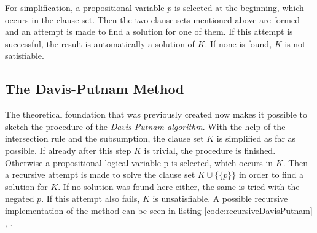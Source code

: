 For simplification, a propositional variable $p$ is selected at the beginning, which occurs in the clause set. Then the two clause sets mentioned above are formed and an attempt is made to find a solution for one of them. If this attempt is successful, the result is automatically a solution of $K$. If none is found, $K$ is not satisfiable.

\subsection{The Davis-Putnam Method}
\label{sub:sciDavisPutnamMethod}
The theoretical foundation that was previously created now makes it possible to sketch the procedure of the \textit{Davis-Putnam algorithm}. With the help of the intersection rule and the subsumption, the clause set $K$ is simplified as far as possible. If already after this step $K$ is trivial, the procedure is finished. Otherwise a propositional logical variable p is selected, which occurs in $K$. Then a recursive attempt is made to solve the clause set $K \cup \bigl\{\{p\}\bigr\}$ in order to find a solution for $K$. If no solution was found here either, the same is tried with the negated $p$. If this attempt also fails, $K$ is unsatisfiable. A possible recursive implementation of the method can be seen in listing \ref{code:recursiveDavisPutnam} \cite{Zhang2000}, \cite{Stroetman2019}.

